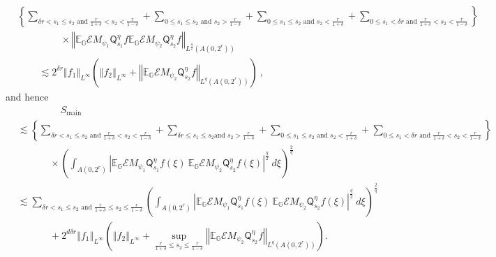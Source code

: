 \documentclass{amsart}%
\theoremstyle{plain}
\numberwithin{equation}{section}
\begin{document}
\begin{align*}
& \left\{  \sum_{\delta r<s_{1}\leq s_{2}\text{ and }\frac{r}{1+\delta}%
<s_{2}<\frac{r}{1-\delta}}+\sum_{0\leq s_{1}\leq s_{2}\text{ and }s_{2}%
>\frac{r}{1-\delta}}+\sum_{0\leq s_{1}\leq s_{2}\text{ and }s_{2}<\frac
{r}{1+\delta}}+\sum_{0\leq s_{1}<\delta r\text{ and }\frac{r}{1+\delta}%
<s_{2}<\frac{r}{1-\delta}}\right\} \\
& \ \ \ \ \ \ \ \ \ \ \ \ \ \ \ \ \ \ \ \ \times\left\Vert \mathbb{E}%
_{\mathbb{G}}\mathcal{E}M_{\psi_{1}}\mathsf{Q}_{s_{1}}^{\eta}f\mathbb{E}%
_{\mathbb{G}}\mathcal{E}M_{\psi_{2}}\mathsf{Q}_{s_{2}}^{\eta}f\right\Vert
_{L^{\frac{q}{2}}\left(  A\left(  0,2^{r}\right)  \right)  }\\
& \ \ \ \ \ \ \ \ \ \ \lesssim2^{\delta r}\left\Vert f_{1}\right\Vert
_{L^{\infty}}\left(  \left\Vert f_{2}\right\Vert _{L^{\infty}}+\left\Vert
\mathbb{E}_{\mathbb{G}}\mathcal{E}M_{\psi_{2}}\mathsf{Q}_{s_{2}}^{\eta
}f\right\Vert _{L^{q}\left(  A\left(  0,2^{r}\right)  \right)  }\right)  \ ,
\end{align*}
and hence%
\begin{align}
& \ \ \ \ \ \ \ \ \ \ \ \ \ \ \ \ \ \ \ \ S_{\operatorname*{main}}%
\label{SAA}\\
& \lesssim\left\{  \sum_{\delta r<s_{1}\leq s_{2}\text{ and }\frac{r}%
{1+\delta}<s_{2}<\frac{r}{1-\delta}}+\sum_{\delta r\leq s_{1}\leq s_{2}\text{
and }s_{2}>\frac{r}{1-\delta}}+\sum_{0\leq s_{1}\leq s_{2}\text{ and }%
s_{2}<\frac{r}{1+\delta}}+\sum_{0\leq s_{1}<\delta r\text{ and }\frac
{r}{1+\delta}<s_{2}<\frac{r}{1-\delta}}\right\} \nonumber\\
& \ \ \ \ \ \ \ \ \ \ \ \ \ \ \ \times\left(  \int_{A\left(  0,2^{r}\right)
}\left\vert \mathbb{E}_{\mathbb{G}}\mathcal{E}M_{\psi_{1}}\mathsf{Q}_{s_{1}%
}^{\eta}f\left(  \xi\right)  \ \mathbb{E}_{\mathbb{G}}\mathcal{E}M_{\psi_{2}%
}\mathsf{Q}_{s_{2}}^{\eta}f\left(  \xi\right)  \right\vert ^{\frac{q}{2}%
}\ d\xi\right)  ^{\frac{2}{q}}\nonumber\\
& \lesssim\sum_{\delta r<s_{1}\leq s_{2}\text{ and }\frac{r}{1+\delta}\leq
s_{2}\leq\frac{r}{1-\delta}}\left(  \int_{A\left(  0,2^{r}\right)  }\left\vert
\mathbb{E}_{\mathbb{G}}\mathcal{E}M_{\psi_{1}}\mathsf{Q}_{s_{1}}^{\eta
}f\left(  \xi\right)  \ \mathbb{E}_{\mathbb{G}}\mathcal{E}M_{\psi_{2}%
}\mathsf{Q}_{s_{2}}^{\eta}f\left(  \xi\right)  \right\vert ^{\frac{q}{2}%
}\ d\xi\right)  ^{\frac{2}{q}}\nonumber\\
& \ \ \ \ \ \ \ \ \ \ \ \ \ \ \ +2^{d\delta r}\left\Vert f_{1}\right\Vert
_{L^{\infty}}\left(  \left\Vert f_{2}\right\Vert _{L^{\infty}}+\sup_{\frac
{r}{1+\delta}\leq s_{2}\leq\frac{r}{1-\delta}}\left\Vert \mathbb{E}%
_{\mathbb{G}}\mathcal{E}M_{\psi_{2}}\mathsf{Q}_{s_{2}}^{\eta}f\right\Vert
_{L^{q}\left(  A\left(  0,2^{r}\right)  \right)  }\right)  .\nonumber
\end{align}
\end{document}

